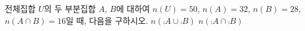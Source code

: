 전체집합 $U$의 두 부분집합 $A$, $B$에 대하여 $n(U)=50$, $n(A)=32$, $n(B)=28$, $n(A\cap B)=16$일 때, 다음을 구하시오.
 $n(\comp{A}\cup\comp{B})$
 $n(\comp{A}\cap\comp{B})$
